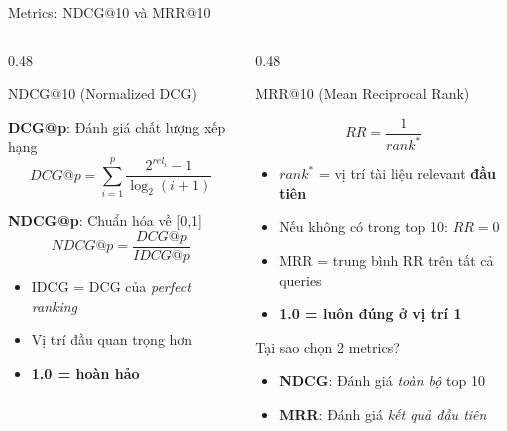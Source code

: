\begin{frame}{Metrics: NDCG@10 và MRR@10}
\begin{columns}[T]
\begin{column}{0.48\textwidth}

\begin{block}{NDCG@10 {\scriptsize (Normalized DCG)}}
{\footnotesize
\textbf{DCG@p}: Đánh giá chất lượng xếp hạng
\[
DCG@p = \sum_{i=1}^{p} \frac{2^{rel_i} - 1}{\log_2(i+1)}
\]

\textbf{NDCG@p}: Chuẩn hóa về [0,1]
\[
NDCG@p = \frac{DCG@p}{IDCG@p}
\]

\begin{itemize}\itemsep0pt \parskip0pt 
    \item IDCG = DCG của \textit{perfect ranking}
    \item Vị trí đầu quan trọng hơn
    \item \textbf{1.0 = hoàn hảo}
\end{itemize}
}
\end{block}

\end{column}
\begin{column}{0.48\textwidth}

\begin{block}{MRR@10 {\scriptsize (Mean Reciprocal Rank)}}
{\footnotesize
\[
RR = \frac{1}{rank^*}
\]

\begin{itemize}\itemsep0pt \parskip0pt 
    \item $rank^*$ = vị trí tài liệu relevant \textbf{đầu tiên}
    \item Nếu không có trong top 10: $RR = 0$
    \item MRR = trung bình RR trên tất cả queries
    \item \textbf{1.0 = luôn đúng ở vị trí 1}
\end{itemize}
}
\end{block}

\vspace{0.05cm}

\begin{exampleblock}{Tại sao chọn 2 metrics?}
{\footnotesize
\begin{itemize}\itemsep0pt \parskip0pt 
    \item \textbf{NDCG}: Đánh giá \textit{toàn bộ} top 10
    \item \textbf{MRR}: Đánh giá \textit{kết quả đầu tiên}
\end{itemize}
}
\end{exampleblock}

\end{column}
\end{columns}
\end{frame}

